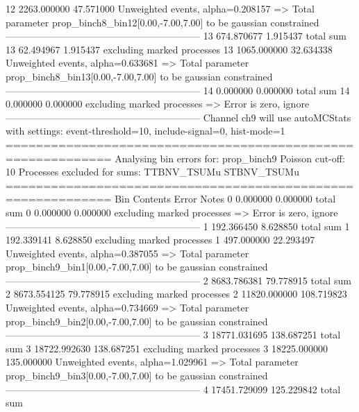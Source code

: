 12         2263.000000     47.571000       Unweighted events, alpha=0.208157
  => Total parameter prop_binch8_bin12[0.00,-7.00,7.00] to be gaussian constrained
------------------------------------------------------------
13         674.870677      1.915437        total sum                     
13         62.494967       1.915437        excluding marked processes    
13         1065.000000     32.634338       Unweighted events, alpha=0.633681
  => Total parameter prop_binch8_bin13[0.00,-7.00,7.00] to be gaussian constrained
------------------------------------------------------------
14         0.000000        0.000000        total sum                     
14         0.000000        0.000000        excluding marked processes    
  => Error is zero, ignore      
------------------------------------------------------------
Channel ch9 will use autoMCStats with settings: event-threshold=10, include-signal=0, hist-mode=1
============================================================
Analysing bin errors for: prop_binch9
Poisson cut-off: 10
Processes excluded for sums: TTBNV_TSUMu STBNV_TSUMu
============================================================
Bin        Contents        Error           Notes                         
0          0.000000        0.000000        total sum                     
0          0.000000        0.000000        excluding marked processes    
  => Error is zero, ignore      
------------------------------------------------------------
1          192.366450      8.628850        total sum                     
1          192.339141      8.628850        excluding marked processes    
1          497.000000      22.293497       Unweighted events, alpha=0.387055
  => Total parameter prop_binch9_bin1[0.00,-7.00,7.00] to be gaussian constrained
------------------------------------------------------------
2          8683.786381     79.778915       total sum                     
2          8673.554125     79.778915       excluding marked processes    
2          11820.000000    108.719823      Unweighted events, alpha=0.734669
  => Total parameter prop_binch9_bin2[0.00,-7.00,7.00] to be gaussian constrained
------------------------------------------------------------
3          18771.031695    138.687251      total sum                     
3          18722.992630    138.687251      excluding marked processes    
3          18225.000000    135.000000      Unweighted events, alpha=1.029961
  => Total parameter prop_binch9_bin3[0.00,-7.00,7.00] to be gaussian constrained
------------------------------------------------------------
4          17451.729099    125.229842      total sum                     
